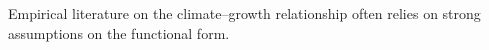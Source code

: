 \documentclass[preview]{standalone}
\begin{document}
    \selectfont

\begin{center}
Empirical literature on the climate–growth relationship often relies on strong assumptions on the functional form.
\end{center}
\end{document}
